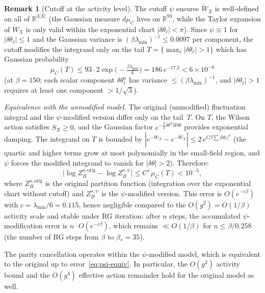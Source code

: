 \documentclass[11pt]{article}
\theoremstyle{definition}
\newtheorem{remark}[theorem]{Remark}
\newcommand{\R}{\mathbb{R}}
\begin{document}
\begin{remark}[Cutoff at the activity level]\label{rem:cutoff-activity}
The cutoff $\psi$ ensures $\widetilde{W}_X$ is well-defined on all
of $\R^{3|X|}$ (the Gaussian measure $d\mu_C$ lives on $\R^{93}$,
while the Taylor expansion of $W_X$ is only valid within the
exponential chart $|\delta\theta_\ell|<\pi$).  Since
$\psi\equiv 1$ for $|\delta\theta_\ell|\le 1$ and the Gaussian
variance is $(\beta\lambda_{\min})^{-1}\le 0.0097$ per component,
the cutoff modifies the integrand only on the tail
$T=\{\max_\ell|\delta\theta_\ell|>1\}$ which has Gaussian probability
\begin{equation}\label{eq:tail-prob}
\mu_C(T)\le 93\cdot 2\exp\bigl(-\tfrac{\beta\lambda_{\min}}{6}\bigr)
=186\,e^{-17.2}<6\times 10^{-6}
\end{equation}
(at $\beta=150$; each scalar component $\delta\theta_\ell^a$ has
variance $\le(\beta\lambda_{\min})^{-1}$, and
$|\delta\theta_\ell|>1$ requires at least one component $>1/\sqrt{3}$).

\emph{Equivalence with the unmodified model.}
The original (unmodified) fluctuation integral and the
$\psi$-modified version differ only on the tail~$T$.
On $T$, the Wilson action satisfies $S_X\ge 0$,
and the Gaussian factor $e^{-\frac{\beta}{2}\delta\theta^T H\delta\theta}$
provides exponential damping.  The integrand on $T$ is bounded by
$|e^{-W_X}-e^{-\widetilde{W}_X}|\le 2\,e^{C\beta\sum|\delta\theta_\ell|^4}$
(the quartic and higher terms grow at most polynomially in the
small-field region, and $\psi$ forces the modified integrand to
vanish for $|\delta\theta|>2$).  Therefore:
\begin{equation}\label{eq:psi-equiv}
\bigl|\log Z_B^{s,\mathrm{orig}}-\log Z_B^{s,\psi}\bigr|
\le C'\,\mu_C(T)<10^{-5},
\end{equation}
where $Z_B^{s,\mathrm{orig}}$ is the original partition function
(integration over the exponential chart without cutoff) and
$Z_B^{s,\psi}$ is the $\psi$-modified version.
This error is $O(e^{-c\beta})$ with $c=\lambda_{\min}/6=0.115$,
hence negligible compared to the $O(g^2)=O(1/\beta)$ activity
scale and stable under RG iteration: after $n$ steps,
the accumulated $\psi$-modification error is $n\cdot O(e^{-c\beta})$,
which remains $\ll O(1/\beta)$ for $n\le\beta/0.258$
(the number of RG steps from $\beta$ to $\beta_*=35$).

The parity cancellation operates within the $\psi$-modified model,
which is equivalent to the original up to error~\eqref{eq:psi-equiv}.
In particular, the $O(g^2)$ activity bound and the $O(g^4)$
effective action remainder hold for the original model as well.
\end{remark}
\end{document}
